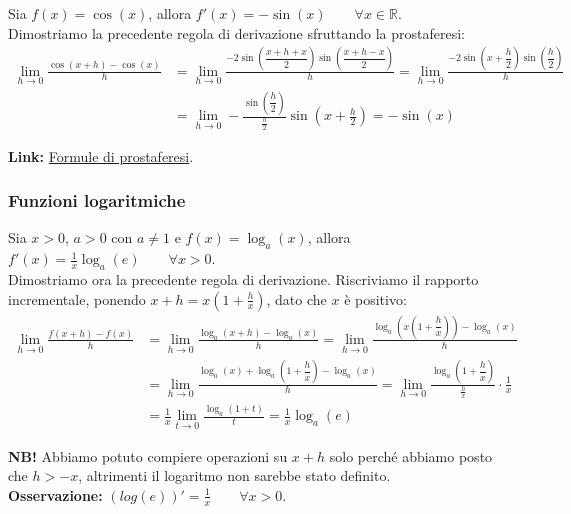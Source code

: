 \documentclass{article}
\begin{document}
\noindent Sia $f(x) = \cos(x)$, allora $f'(x) = -\sin(x) \qquad \forall x \in \mathbb{R}$. \\

\noindent Dimostriamo la precedente regola di derivazione sfruttando la prostaferesi:
\begin{align*}
    \lim_{h \to 0} \frac{\cos(x + h) - \cos(x)}{h} &= \lim_{h \to 0}\frac{-2\sin\left(\dfrac{x + h + x}{2}\right)\sin\left(\dfrac{x + h - x}{2}\right)}{h} = \lim_{h \to 0} \frac{-2\sin\left(x + \dfrac{h}{2}\right)\sin\left(\dfrac{h}{2}\right)}{h}\\
    &= \lim_{h \to 0} - \frac{\sin\left(\dfrac{h}{2}\right)}{\frac{h}{2}}\sin\left(x + \frac{h}{2}\right) = -\sin(x)
\end{align*}

\noindent\textbf{Link:} \href{https://www.youmath.it/formulari/65-formulari-di-trigonometria-logaritmi-esponenziali/1048-formule-di-prostaferesi.html}{Formule di prostaferesi}.

\subsubsection{Funzioni logaritmiche}
Sia $x > 0$, $a > 0$ con $a \neq 1$ e $f(x) = \log_a(x)$, allora $f'(x) = \frac{1}{x} \log_a(e) \qquad \forall x > 0$.\\

\noindent Dimostriamo ora la precedente regola di derivazione. Riscriviamo il rapporto incrementale, ponendo $x + h = x(1 + \frac{h}{x})$, dato che $x$ è positivo:
\begin{align*}
    \lim_{h \to 0} \frac{f(x + h) - f(x)}{h} &= \lim_{h \to 0} \frac{\log_a(x + h) - \log_a(x)}{h} = \lim_{h \to 0} \frac{\log_a\left(x\left(1 + \dfrac{h}{x}\right)\right) - \log_a(x)}{h}\\
    &= \lim_{h \to 0} \frac{\log_a(x) + \log_a\left(1 + \dfrac{h}{x}\right) - \log_a(x)}{h} = \lim_{h \to 0} \frac{\log_a\left(1 + \dfrac{h}{x}\right)}{\frac{h}{x}} \cdot \frac{1}{x} \\
    &= \frac{1}{x} \lim_{t \to 0}\frac{\log_a(1 + t)}{t} = \frac{1}{x} \log_a(e)
\end{align*}

\noindent\textbf{NB!} Abbiamo potuto compiere operazioni su $x + h$ solo perché abbiamo posto che $h > -x$, altrimenti il logaritmo non sarebbe stato definito.\\

\noindent\textbf{Osservazione:} $(log(e))' = \frac{1}{x} \qquad \forall x > 0$.\\
\end{document}
